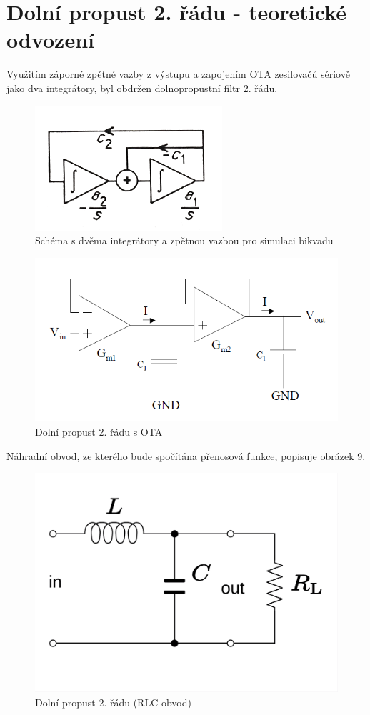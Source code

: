 \documentclass[twoside]{article}
\begin{document}
\section{Dolní propust 2. řádu - teoretické odvození}
Využitím záporné zpětné vazby z výstupu a zapojením OTA zesilovačů sériově jako dva integrátory, byl obdržen dolnopropustní filtr 2. řádu.
\begin{figure}[H]
\centering
\includegraphics[scale=0.8]{image11.png}
\caption{Schéma s dvěma integrátory a zpětnou vazbou pro simulaci bikvadu \cite{7}}
\end{figure}
\begin{figure}[H]
\centering
\includegraphics[scale=0.5]{zapojeni.png}
\caption{Dolní propust 2. řádu s OTA \cite{8}}
\end{figure}
\noindent Náhradní obvod, ze kterého bude spočítána přenosová funkce, popisuje obrázek 9.
\begin{figure}[H]
\centering
\includegraphics[scale=0.2]{RLC_low-pass.png}
\caption{Dolní propust 2. řádu (RLC obvod) \cite{9}}
\end{figure}
\end{document}
